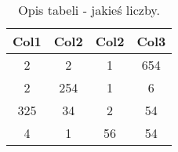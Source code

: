 \begin{table}[htbp]
\centering
\begin{tabular}{||c c c c||} 
 \hline
 Col1 & Col2 & Col2 & Col3 \\ [0.5ex] 
 \hline\hline
 2 & 2 & 1 & 654   \\
 \hline
 2 & 254 & 1 & 6  \\
 \hline
 325 & 34 & 2 & 54 \\
 \hline
 4 & 1 & 56 & 54 \\
 \hline
\end{tabular}
\label{tab:random_numbers}
\caption{Opis tabeli - jakieś liczby.}
\end{table}